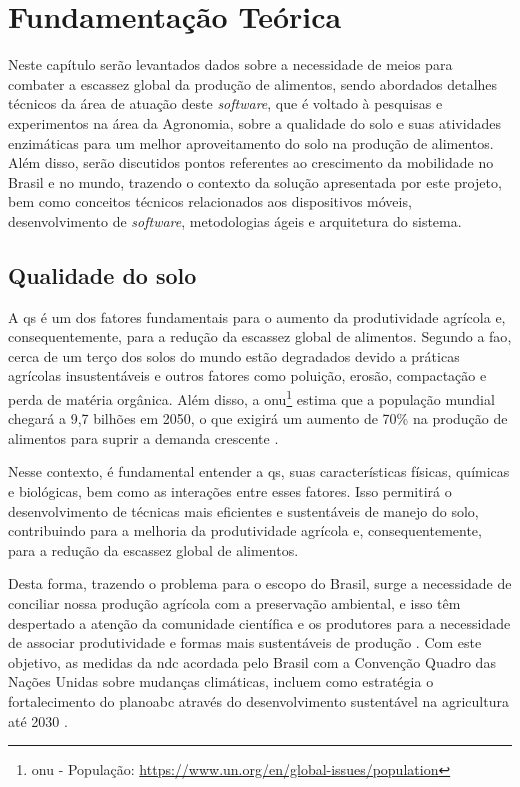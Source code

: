 \chapter{Fundamentação Teórica}
Neste capítulo serão levantados dados sobre a necessidade de meios para combater a escassez global da produção de alimentos, sendo abordados detalhes técnicos da área de atuação deste \textit{software}, que é voltado à pesquisas e experimentos na área da Agronomia, sobre a qualidade do solo e suas atividades enzimáticas para um melhor aproveitamento do solo na produção de alimentos. Além disso, serão discutidos pontos referentes ao crescimento da mobilidade no Brasil e no mundo, trazendo o contexto da solução apresentada por este projeto, bem como conceitos técnicos relacionados aos dispositivos móveis, desenvolvimento de \textit{software}, metodologias ágeis e arquitetura do sistema.

\section{Qualidade do solo}\label{sec:qualidade_solo}
A \ac{qs} é um dos fatores fundamentais para o aumento da produtividade agrícola e, consequentemente, para a redução da escassez global de alimentos. Segundo a \ac{fao}, cerca de um terço dos solos do mundo estão degradados devido a práticas agrícolas insustentáveis e outros fatores como poluição, erosão, compactação e perda de matéria orgânica. Além disso, a \ac{onu}\footnote{\ac{onu} - População: \url{https://www.un.org/en/global-issues/population}} estima que a população mundial chegará a 9,7 bilhões em 2050, o que exigirá um aumento de 70\% na produção de alimentos para suprir a demanda crescente \citet{fao2018future}.

Nesse contexto, é fundamental entender a \ac{qs}, suas características físicas, químicas e biológicas, bem como as interações entre esses fatores. Isso permitirá o desenvolvimento de técnicas mais eficientes e sustentáveis de manejo do solo, contribuindo para a melhoria da produtividade agrícola e, consequentemente, para a redução da escassez global de alimentos.

Desta forma, trazendo o problema para o escopo do Brasil, surge a necessidade de conciliar nossa produção agrícola com a preservação ambiental, e isso têm despertado a atenção da comunidade científica e os produtores para a necessidade de associar produtividade e formas mais sustentáveis de produção \citet{lopez2019carbon}. Com este objetivo, as medidas da \ac{ndc} acordada pelo Brasil com a Convenção Quadro das Nações Unidas sobre mudanças climáticas, incluem como estratégia o fortalecimento do \ac{planoabc} através do desenvolvimento sustentável na agricultura até 2030 \citet{embrapa_visao_2030}.

